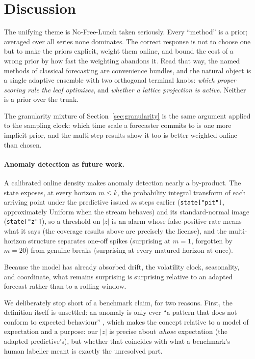 \documentclass[article]{jss}
\providecommand{\code}[1]{\texttt{#1}}
\begin{document}
\section{Discussion} \label{sec:discussion}

The unifying theme is No-Free-Lunch \citep{wolpert1997no} taken seriously. Every
``method'' is a prior; averaged over all series none dominates. The correct
response is not to choose one but to make the priors explicit, weight them online,
and bound the cost of a wrong prior by how fast the weighting abandons it. Read
that way, the named methods of classical forecasting are convenience bundles, and
the natural object is a single adaptive ensemble with two orthogonal terminal
knobs: \emph{which proper scoring rule the leaf optimises}, and \emph{whether a
lattice projection is active}. Neither is a prior over the trunk.

The
granularity mixture of Section~\ref{sec:granularity} is the same argument applied
to the sampling clock: which time scale a forecaster commits to is one more
implicit prior, and the multi-step results show it too is better weighted online
than chosen.

\paragraph{Anomaly detection as future work.}
A calibrated online density makes anomaly detection nearly a by-product. The
state exposes, at every horizon $m \le k$, the probability integral transform
of each arriving point under the predictive issued $m$ steps earlier
(\code{state["pit"]}, approximately Uniform when the stream behaves) and its
standard-normal image (\code{state["z"]}), so a threshold on $|z|$ is an alarm
whose false-positive rate means what it says (the coverage results above are
precisely the license), and the multi-horizon structure separates one-off
spikes (surprising at $m=1$, forgotten by $m=20$) from genuine breaks
(surprising at every matured horizon at once).

Because the model has already
absorbed drift, the volatility clock, seasonality, and coordinate, what remains
surprising is surprising relative to an adapted forecast rather than to a
rolling window.

We deliberately stop short of a benchmark claim, for two reasons.
First, the definition itself is unsettled: an anomaly is only ever ``a pattern
that does not conform to expected behaviour'' \citep{chandola2009anomaly},
which makes the concept relative to a model of expectation and a purpose:
our $|z|$ is precise about \emph{whose} expectation (the adapted predictive's),
but whether that coincides with what a benchmark's human labeller meant is
exactly the unresolved part.
\end{document}
